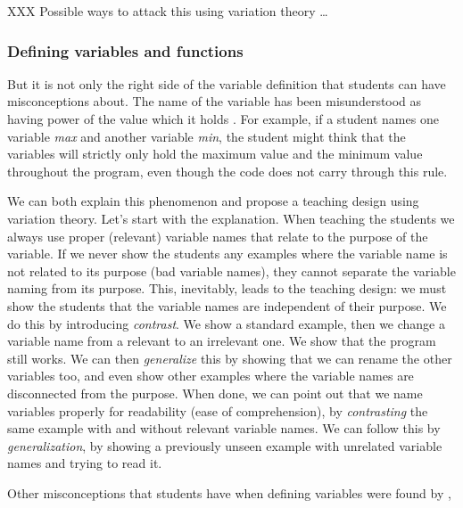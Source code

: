XXX Possible ways to attack this using variation theory \dots

\subsubsection{Defining variables and functions}

But it is not only the right side of the variable definition that students 
can 
have misconceptions about. The name of the variable has been misunderstood 
as 
having power of the value which it holds 
\parencite{MisconceptionsSurvey2017,Sleeman1984}. For example, if a student 
names one variable \emph{max} and another variable \emph{min}, the student 
might think that the variables will strictly only hold the maximum value and 
the minimum value throughout the program, even though the code does not 
carry through this rule. 

We can both explain this phenomenon and propose a teaching design using 
variation theory.
Let's start with the explanation.
When teaching the students we always use proper (\ie relevant) variable 
names 
that relate to the purpose of the variable.
If we never show the students any examples where the variable name is not 
related to its purpose (bad variable names), they cannot separate the 
variable 
naming from its purpose.
This, inevitably, leads to the teaching design:
we must show the students that the variable names are independent of their 
purpose.
We do this by introducing \emph{contrast}.
We show a standard example, then we change a variable name from a relevant 
to 
an irrelevant one.
We show that the program still works.
We can then \emph{generalize} this by showing that we can rename the other 
variables too, and even show other examples where the variable names are 
disconnected from the purpose.
When done, we can point out that we name variables properly for readability 
(ease of comprehension), by \emph{contrasting} the same example with and 
without relevant variable names.
We can follow this by \emph{generalization}, by showing a previously unseen 
example with unrelated variable names and trying to read it.

Other misconceptions that students have when defining variables were found 
by \textcite{GuoMarkelZhang2020},

